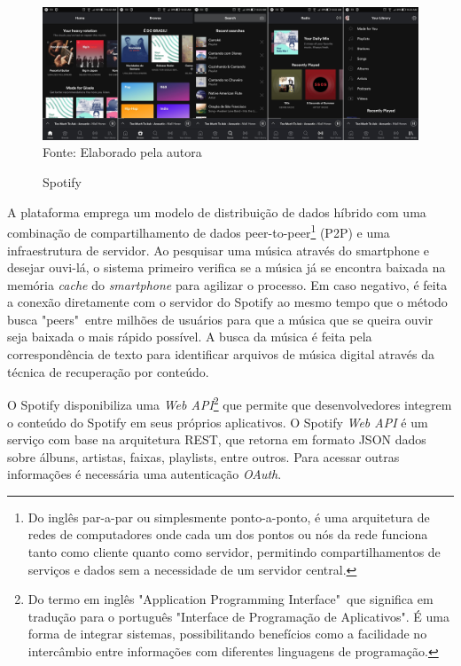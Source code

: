 \begin{figure}[!htb]
   \centering
   \caption{Spotify}\label{fig:spotify} 
   \includegraphics[scale=0.1]{figuras/spotify.jpg}
   \\Fonte: Elaborado pela autora
\end{figure}

A plataforma emprega um modelo de distribuição de dados híbrido com uma combinação de compartilhamento de dados peer-to-peer\footnote{Do inglês par-a-par ou simplesmente ponto-a-ponto, é uma arquitetura de redes de computadores onde cada um dos pontos ou nós da rede funciona tanto como cliente quanto como servidor, permitindo compartilhamentos de serviços e dados sem a necessidade de um servidor central.} (P2P) e uma infraestrutura de servidor. Ao pesquisar uma música através do smartphone e desejar ouvi-lá, o sistema primeiro verifica se a música já se encontra baixada na memória \textit{cache} do \textit{smartphone} para agilizar o processo. Em caso negativo, é feita a conexão diretamente com o servidor do Spotify ao mesmo tempo que o método busca "peers"\ entre milhões de usuários para que a música que se queira ouvir seja baixada o mais rápido possível. A busca da música é feita pela correspondência de texto para identificar arquivos de música digital através da técnica de recuperação por conteúdo.

O Spotify disponibiliza uma \textit{Web API}\footnote{Do termo em inglês "Application Programming Interface"\ que significa em tradução para o português "Interface de Programação de Aplicativos". É uma forma de integrar sistemas, possibilitando benefícios como a facilidade no intercâmbio entre informações com diferentes linguagens de programação.} que permite que desenvolvedores integrem o conteúdo do Spotify em seus próprios aplicativos. O Spotify \textit{Web API} é um serviço com base na arquitetura REST, que retorna em formato JSON dados sobre álbuns, artistas, faixas, playlists, entre outros. Para acessar outras informações é necessária uma autenticação \textit{OAuth}.

